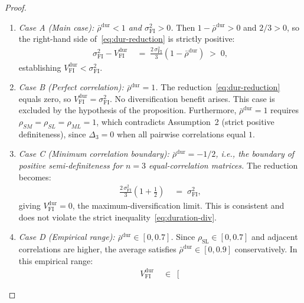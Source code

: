 \documentclass[12pt,openany]{book}
\numberwithin{equation}{chapter}
\theoremstyle{plain}
\theoremstyle{definition}
\theoremstyle{remark}
\begin{document}
\begin{proof}
\begin{enumerate}
  \item \textit{Case A (Main case):
        $\bar{\rho}^{\mathrm{dur}} < 1$ and
        $\sigma_{\mathrm{FI}}^2 > 0$.}
        Then $1 - \bar{\rho}^{\mathrm{dur}} > 0$ and $2/3 > 0$,
        so the right-hand side of~\eqref{eq:dur-reduction} is
        strictly positive:
        \begin{align}
          \sigma_{\mathrm{FI}}^2
          - V_{\mathrm{FI}}^{\mathrm{dur}}
          &\;=\;
          \frac{2\,\sigma_{\mathrm{FI}}^2}{3}
          (1 - \bar{\rho}^{\mathrm{dur}})
          \;>\; 0,
        \end{align}
        establishing $V_{\mathrm{FI}}^{\mathrm{dur}}
        < \sigma_{\mathrm{FI}}^2$.
  \item \textit{Case B (Perfect correlation):
        $\bar{\rho}^{\mathrm{dur}} = 1$.}
        The reduction~\eqref{eq:dur-reduction} equals zero, so
        $V_{\mathrm{FI}}^{\mathrm{dur}} = \sigma_{\mathrm{FI}}^2$.
        No diversification benefit arises.  This case is excluded
        by the hypothesis of the proposition.  Furthermore,
        $\bar{\rho}^{\mathrm{dur}} = 1$ requires
        $\rho_{SM} = \rho_{SL} = \rho_{ML} = 1$, which contradicts
        Assumption~2 (strict positive definiteness), since
        $\Delta_3 = 0$ when all pairwise correlations equal $1$.
  \item \textit{Case C (Minimum correlation boundary):
        $\bar{\rho}^{\mathrm{dur}} = -1/2$, i.e., the boundary of
        positive semi-definiteness for $n=3$ equal-correlation
        matrices.}
        The reduction becomes:
        \begin{align}
          \frac{2\,\sigma_{\mathrm{FI}}^2}{3}
          \!\left(1 + \tfrac{1}{2}\right)
          &\;=\; \sigma_{\mathrm{FI}}^2,
        \end{align}
        giving $V_{\mathrm{FI}}^{\mathrm{dur}} = 0$, the
        maximum-diversification limit.  This is consistent and does
        not violate the strict inequality~\eqref{eq:duration-div}.
  \item \textit{Case D (Empirical range):
        $\bar{\rho}^{\mathrm{dur}} \in [0, 0.7]$.}
        Since $\rho_{\mathrm{SL}} \in [0, 0.7]$ and adjacent
        correlations are higher, the average satisfies
        $\bar{\rho}^{\mathrm{dur}} \in [0, 0.9]$ conservatively.
        In this empirical range:
        \begin{align}
          V_{\mathrm{FI}}^{\mathrm{dur}}
          &\;\in\;
          \left[

\end{align}
\end{enumerate}
\end{proof}
\end{document}
